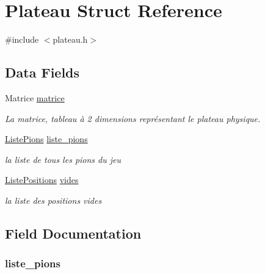 \hypertarget{struct_plateau}{\section{Plateau Struct Reference}
\label{struct_plateau}
}


{\ttfamily \#include $<$plateau.\-h$>$}

\subsection*{Data Fields}
\begin{DoxyCompactItemize}
\item 
Matrice \hyperlink{struct_plateau_a5f45fe22d523ebf6b9fb3f9f154b4fdd}{matrice}
\begin{DoxyCompactList}\small\item\em La matrice, tableau à 2 dimensions représentant le plateau physique. \end{DoxyCompactList}\item 
\hyperlink{struct_liste_pions}{Liste\-Pions} \hyperlink{struct_plateau_a8803e00bb4f0a564f28e958e96f284c7}{liste\-\_\-pions}
\begin{DoxyCompactList}\small\item\em la liste de tous les pions du jeu \end{DoxyCompactList}\item 
\hyperlink{struct_liste_positions}{Liste\-Positions} \hyperlink{struct_plateau_a59c898edd92cfc770d4a27b3648cc710}{vides}
\begin{DoxyCompactList}\small\item\em la liste des positions vides \end{DoxyCompactList}\end{DoxyCompactItemize}


\subsection{Field Documentation}
\hypertarget{struct_plateau_a8803e00bb4f0a564f28e958e96f284c7}{
\subsubsection[{liste\-\_\-pions}]{ liste\-\_\-pions}}\label{struct_plateau_a8803e00bb4f0a564f28e958e96f284c7}


